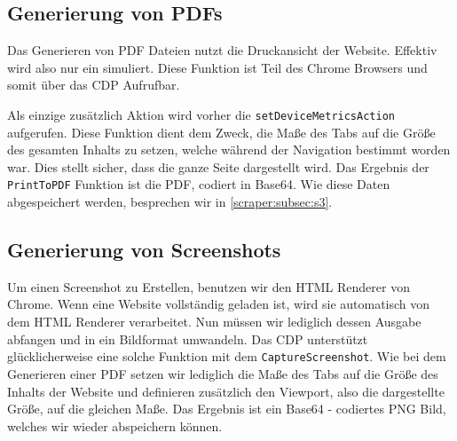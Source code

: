 \subsection{Generierung von PDFs} \label{scraper:subsec:go:pdf}
Das Generieren von PDF Dateien nutzt die Druckansicht der Website. Effektiv wird also nur ein  simuliert. Diese Funktion ist Teil des Chrome Browsers und somit über das CDP Aufrufbar.  
Als einzige zusätzlich Aktion wird vorher die \verb|setDeviceMetricsAction| aufgerufen. Diese Funktion dient dem Zweck, die Maße des Tabs auf die Größe des gesamten Inhalts zu setzen, welche während der Navigation bestimmt worden war. Dies stellt sicher, dass die ganze Seite dargestellt wird. Das Ergebnis der \verb|PrintToPDF| Funktion ist die PDF, codiert in Base64. Wie diese Daten abgespeichert werden, besprechen wir in \autoref{scraper:subsec:s3}.
\subsection{Generierung von Screenshots} \label{scraper:subsec:go:screenshot}
Um einen Screenshot zu Erstellen, benutzen wir den HTML Renderer von Chrome. Wenn eine Website vollständig geladen ist, wird sie automatisch von dem HTML Renderer verarbeitet. Nun müssen wir lediglich dessen Ausgabe abfangen und in ein Bildformat umwandeln. Das CDP unterstützt glücklicherweise eine solche Funktion mit dem \verb|CaptureScreenshot|. Wie bei dem Generieren einer PDF setzen wir lediglich die Maße des Tabs auf die Größe des Inhalts der Website und definieren zusätzlich den Viewport, also die dargestellte Größe, auf die gleichen Maße. Das Ergebnis ist ein Base64 - codiertes PNG Bild, welches wir wieder abspeichern können.














